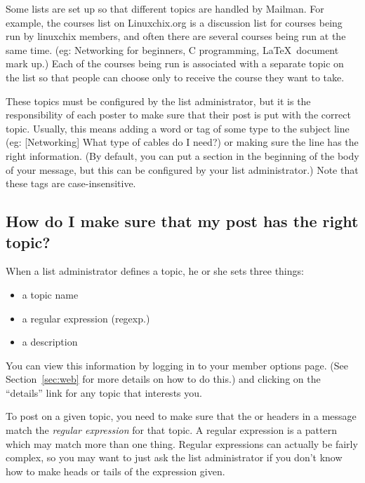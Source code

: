 \documentclass{howto}
\begin{document}
Some lists are set up so that different topics are handled by Mailman.
For example, the courses list on Linuxchix.org is a discussion list for
courses being run by linuxchix members, and often there are several courses
being run at the same time.  
(eg: Networking for beginners, C programming, \LaTeX ~document mark up.)  
Each of the courses being run is associated with a separate topic on the list so that people
can choose only to receive the course they want to take.

These
topics must be configured by the list administrator, but it is the
responsibility of each poster to make sure that their post is put with 
the correct topic.  Usually, this means adding a word or tag of some type to the 
subject line (eg: [Networking] What type of cables do I need?) or making
sure the  line has the right information.  (By default, 
you can put a  section in the beginning of the body
of your message, but this can be configured by your list administrator.)
Note that these tags are case-insensitive.

\subsection{How do I make sure that my post has the right 
	topic?\label{sec:posttopic}}

When a list administrator defines a topic, he or she sets three things:
\begin{itemize}
	\item a topic name
	\item a regular expression (regexp.)
	\item a description
\end{itemize}

You can view this information by logging in to your member options page. 
 (See Section~\ref{sec:web} for more details on how to do this.) and 
clicking on the ``details'' link for any topic that interests you.

To post on a given topic, you need to make sure that the 
 or  headers in a message  
match the \emph{regular expression} for that topic.  
A regular expression is a pattern which may match more than one thing. 
Regular expressions can actually be fairly complex, so you may want to 
just ask the list administrator if you don't know how to make
heads or tails of the expression given.  
\end{document}
